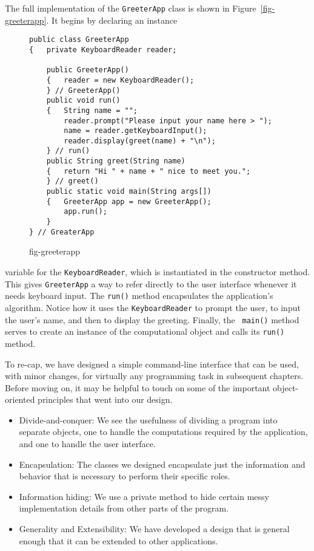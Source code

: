 The full implementation of the {\tt GreeterApp} class is shown in
Figure~\ref{fig-greeterapp}.  It begins by declaring an instance
\begin{figure}[h!]
\jjjprogstart
\begin{jjjlisting}
\begin{lstlisting}
public class GreeterApp 
{   private KeyboardReader reader;

    public GreeterApp() 
    {   reader = new KeyboardReader();
    } // GreeterApp()
    public void run() 
    {   String name = "";
        reader.prompt("Please input your name here > ");
        name = reader.getKeyboardInput();
        reader.display(greet(name) + "\n");
    } // run()
    public String greet(String name) 
    {   return "Hi " + name + " nice to meet you.";
    } // greet()
    public static void main(String args[]) 
    {   GreeterApp app = new GreeterApp();
        app.run();
    }
} // GreaterApp
\end{lstlisting}
\end{jjjlisting}
{fig-greeterapp}
\end{figure}
variable for the {\tt KeyboardReader}, which is instantiated in the
constructor method. This gives {\tt GreeterApp} a way to refer
directly to the user interface whenever it needs keyboard input.  The
{\tt run()} method encapsulates the application's algorithm. Notice
how it uses the {\tt KeyboardReader} to prompt the user, to input the
user's name, and then to display the greeting.  Finally, the {\tt
main()} method serves to create an instance of the computational
object and calls its {\tt run()} method.


To re-cap, we have designed a simple command-line interface that can be
used, with minor changes, for virtually any programming task in
subsequent chapters.  Before moving on, it may be helpful to touch on
some of the important object-oriented principles that went into our
design.

\begin{itemize}
\item Divide-and-conquer: We see the usefulness of dividing a program
into separate objects, one to handle the computations required by the
application, and one to handle the user interface.

\item Encapsulation: The classes we designed encapsulate just the
information and behavior that is necessary to perform their specific
roles.

\item Information hiding: We use a private method to hide certain
messy implementation details from other parts of the program. 

\item Generality and Extensibility: We have developed a design that
is general enough that it can be extended to other applications. 
\end{itemize}

